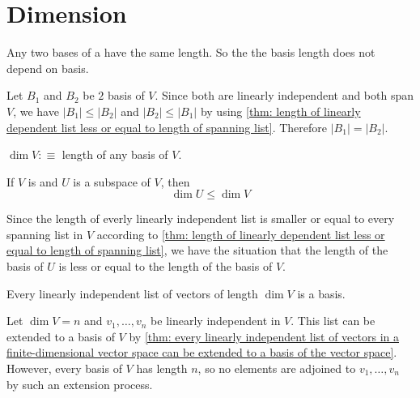 \section{Dimension}

\setcounter{thm}{33}
\begin{thm}  Any two bases of a \fdvs have the same length. So the the basis length does not depend on basis.
\end{thm}
\begin{prf}
  Let $B_1$ and $B_2$ be $2$ basis of $V$. Since both are linearly independent and both span $V$, we have $|B_1| \leq |B_2|$ and $|B_2| \leq |B_1|$ by using \ref{thm: length of linearly dependent list less or equal to length of spanning list}. Therefore $|B_1|=|B_2|.$
\end{prf}

\begin{mydef} [dimension]
  $\dim V :\equiv$ length of any basis of $V$.
\end{mydef}

\setcounter{thm}{36}
\begin{thm} 
  \label{thm: dimension of a subspace}
  If $V$ is \fd and $U$ is a subspace of $V$, then
  \begin{equation}
    \dim U \leq \dim V
  \end{equation}
\end{thm}
\begin{prf}
  Since the length of everly linearly independent list is smaller or equal to every spanning list in $V$ according to
  \ref{thm: length of linearly dependent list less or equal to length of spanning list}, we have the situation that the length of the basis of $U$ is less or equal to the length of the basis of $V$.
\end{prf}


\begin{thm} 
  \label{thm: linearly independent list of the right length is a basis}
  Every linearly independent list of vectors of length $\dim V$ is a basis.
\end{thm}
\begin{prf}
  Let $\dim V = n$ and $v_1, \ldots, v_n$ be linearly independent in $V$. This list can be extended to a basis of $V$ by \ref{thm: every linearly independent list of vectors in a finite-dimensional vector space can be extended to a basis of the vector space}. However, every basis of $V$ has length $n$, so no elements are adjoined to $v_1, \ldots, v_n$ by such an extension process.
\end{prf}

